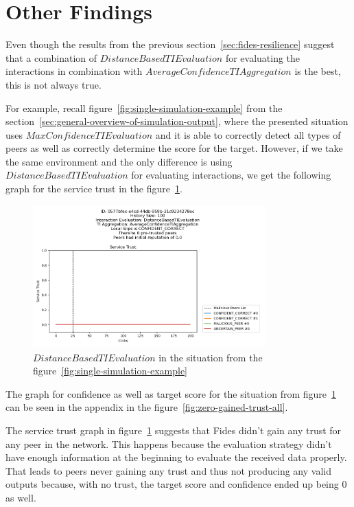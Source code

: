 \newpage
\section{Other Findings}
\label{sec:other-findings}

Even though the results from the previous section~\ref{sec:fides-resilience} suggest that a combination of $DistanceBasedTIEvaluation$ for evaluating the interactions in combination with $AverageConfidenceTIAggregation$ is the best, this is not always true.

For example, recall figure~\ref{fig:single-simulation-example} from the section~\ref{sec:general-overview-of-simulation-output}, where the presented situation uses $MaxConfidenceTIEvaluation$ and it is able to correctly detect all types of peers as well as correctly determine the score for the target.
However, if we take the same environment and the only difference is using $DistanceBasedTIEvaluation$ for evaluating interactions, we get the following graph for the service trust in the figure~\ref{fig:zero-gained-trust}.

\begin{figure}[h]
    \centering
    \includegraphics[width=0.8\textwidth]{assets/zero_gained_trust.png}
    \caption{$DistanceBasedTIEvaluation$ in the situation from the figure~\ref{fig:single-simulation-example}}
    \label{fig:zero-gained-trust}
\end{figure}

The graph for confidence as well as target score for the situation from figure~\ref{fig:zero-gained-trust} can be seen in the appendix in the figure~\ref{fig:zero-gained-trust-all}.

The service trust graph in figure~\ref{fig:zero-gained-trust} suggests that Fides didn't gain any trust for any peer in the network.
This happens because the evaluation strategy didn't have enough information at the beginning to evaluate the received data properly.
That leads to peers never gaining any trust and thus not producing any valid outputs because, with no trust, the target score and confidence ended up being $0$ as well.